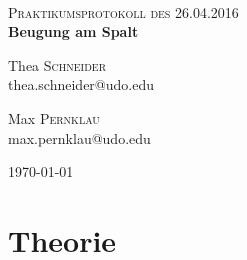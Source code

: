 

\newcommand{\HRule}{\rule{\linewidth}{0.5mm}}


\begin{titlepage}
\begin{center}

~\\[1cm]


\textsc{\Large Praktikumsprotokoll des 26.04.2016}\\

\huge{ \bfseries Beugung am Spalt}\\[1em]


\begin{minipage}{0.4\textwidth}
\begin{flushleft} \large
Thea \textsc{Schneider}\\
thea.schneider@udo.edu
\end{flushleft}
\end{minipage}
\begin{minipage}{0.4\textwidth}
\begin{flushright} \large
Max \textsc{Pernklau}\\
max.pernklau@udo.edu
\end{flushright}
\end{minipage}

\vfill

{\large \today}

\end{center}
\end{titlepage}


\thispagestyle{empty}



\begingroup
\renewcommand{\clearpage}{}
\section{Theorie}
\label{sec:Theorie}
\endgroup









